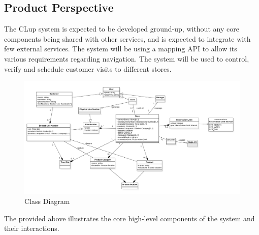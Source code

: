 \subsection{Product Perspective}

The CLup system is expected to be developed ground-up, without any core components being shared with other services, and is expected to integrate with few external services.
The system will be using a mapping API to allow its various requirements regarding navigation.
The system will be used to control, verify and schedule customer visits to different stores.



\begin{figure}[H]
    \centering
    \includegraphics[height=0.5\textwidth]{Images/ClassDiagram.png}
    \caption{Class Diagram}
    \label{fig:ClassDiagram}
\end{figure}
The  provided above illustrates the core high-level components of the system and their interactions.


